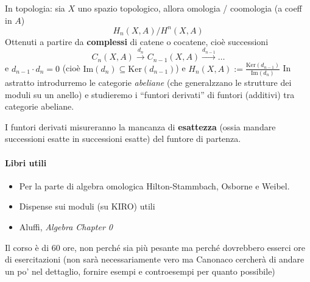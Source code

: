 In topologia: sia \(X\) uno spazio topologico, allora omologia / coomologia (a
coeff in \(A\)) 
\[
  H_{n}{(X, A)} / H^{n}{(X, A)}
\]
Ottenuti a partire da \textbf{complessi} di catene o cocatene, cioè successioni
\[
    C_{n}{(X, A)} \overset{d_{n}}{\to } C_{n-1} {(X, A)} \overset{d_{n-1} }{\to } \dots
\]
e \(d_{n-1} \cdot d_{n} = 0\) (cioè \(\mathrm {Im} {(d_{n})} \subseteq \mathrm{Ker}{(d_{n-1} )} \))  e \(H_{n} {(X, A)} := \frac{\mathrm{Ker}{(d_{n-1} )}}{\mathrm{Im}{(d_{n})}}\) 
In astratto introdurremo le categorie \emph{abeliane} (che generalzzano le
strutture dei moduli su un anello) e studieremo i ``funtori derivati'' di
funtori (additivi) tra categorie abeliane.

I funtori derivati misureranno la mancanza di \textbf{esattezza} (ossia mandare
successioni esatte in successioni esatte) del funtore di
partenza.

\paragraph{Libri utili}
\begin{itemize}[label = --]
    \item Per la parte di algebra omologica Hilton-Stammbach, Osborne e
Weibel.
    \item Dispense sui moduli (su KIRO) utili
    \item Aluffi, \emph{Algebra Chapter 0}
\end{itemize}
Il corso è di 60 ore, non perché sia più pesante ma perché dovrebbero esserci
ore di esercitazioni (non sarà necessariamente vero ma Canonaco cercherà di
andare un po' nel dettaglio, fornire esempi e controesempi per quanto possibile)
